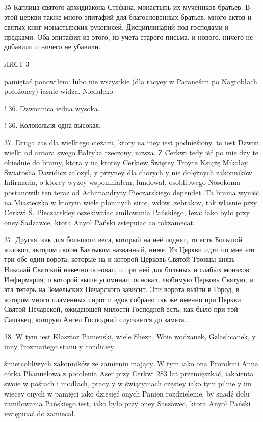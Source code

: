 35 Каплица святого архидиакона Стефана, монастырь их мучеников братьев. В этой церкви также много эпитафий для благословенных братьев, много актов и святых книг монастырских рукописей. Дисциплинарий под господами и предками. Оба эпитафия из этого, из учета старого письма, и нового, ничего не добавили и ничего не убавили.


ЛИСТ 3

pamiętać ponowiłem: lubo nie wszystkie (dla racyey w Paraneśim po Nagrobłach położoney) iasnie widza. Niedaleko


! 36. Dzwonnica iedna wysoka.

! 36. Колокольня одна высокая.

37. Druga zas dla wielkiego cieżaru, ktory na niey iest podnieśiony, to iest Dzwon wielki od autora swego Bałtyka rzeczony, nizsza. Z Cerkwi tedy iść po mie dzy te obiednie do bramy, ktora y na ktorey Cerkiew Świętey Troyce Książę Mikołay Światosha Dawidicz zalozyl, y przyney dla chorych y nie dołężnych zakonników Infirmaria, o ktorey wyżey wspomniałem, fundował, osoblibwego Nosokoma postanowil: ten teraz od Achimandryty Pieczarskiego dependet.
Ta brama wyniść na Miasteczko w ktorym wiele płomnych sirot, wdow ,zebrakov, tak wlasnie przy Cerkwi Ś. Pieczarskiey oszekiwaiac zmiłowania Pańskiego, Ieza: iako było przy oney Sadzawce, ktora Anyoł Pański zstepuiac co rokzamecat.

37. Другая, как для большого веса, который на неё поднят, то есть Большой колокол, автором своим Балтыком названный, ниже. Из Церкви идти по мне эти три обе одни ворота, которые на и которой Церковь Святой Троицы князь Николай Святский навечно основал, и при ней для больных и слабых монахов Инфирмария, о которой выше упоминал, основал, любимую Церковь Святую, и эта теперь на Земельских Печарского зависит. Эти ворота выйти в Город, в котором много пламенных сирот и вдов собрано так же именно при Церкви Святой Печарской, ожидающей милости Господней есть, как было при той Сашавец, которую Ангел Господний спускается до замета.


38. W tym iest Klasztor Panienski, wiele Shezn, Woie wodzanek, Gzlashcanek, y inny ?rozmaitego stanu y condiciey 

 śmiercobliwych zakonników ze zamieniu mający. W tym iako ona Prorokini Anna córka Phanuelowa z potolenia Aser przy Cerkwi 283 lat przemięszkać, iakaienta swoie w pośtach i modłach, pracy y w świątyniach częstey iako tym pilnie y im wiecey onych w pamięci iako dziesięć onych Panien rozdzielenie, by snadź dolu zamiłowania Pańskiego iest, iako było przy oney Saszawec, ktora Anyoł Pański iestępuiać do zamiecał.

